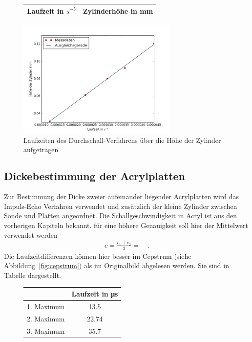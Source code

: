  
 \begin{figure}[h!]
 	\centering
 	\begin{tabular}{c|c}
 		Laufzeit in $s^{-5}$ & Zylinderhöhe in mm\\
 		\hline
 		
 	\end{tabular}
 	\label{tab:durchschall}
 \end{figure}
 
 \begin{figure}[h!]
 	\centering
 	\includegraphics[width=0.7\textwidth]{build/Durchschall.png}
 	\caption{Laufzeiten des Durchschall-Verfahrens über die Höhe der Zylinder aufgetragen}
 	\label{fig:durchschall}
 \end{figure}
 


  
  
  \clearpage
  \subsection{Dickebestimmung der Acrylplatten} 
  Zur Bestimmung der Dicke zweier aufeinander liegender Acrylplatten wird das Impuls-Echo Verfahren verwendet und zusätzlich der kleine Zylinder zwischen Sonde und Platten angeordnet. Die Schallgeschwindigkeit in Acryl ist aus den vorherigen Kapiteln bekannt. für eine höhere Genauigkeit soll hier der Mittelwert verwendet werden
  \begin{align}
  	c = \frac{c_1+ c_2}{2} =  \quad .
  \end{align}
  Die Laufzeitdifferenzen können hier besser im Cepstrum (siehe Abbildung~\ref{fig:cepstrum}) als im Originalbild abgelesen werden. Sie sind in Tabelle \label{tab:laufzeiten_platte} dargestellt.
  
   \begin{figure}[h!]
   	\centering
   	\begin{tabular}{c|c}
   	 & Laufzeit in \si{\micro\second}\\
   		\hline
   	1. Maximum & 13.5 \\
   	2. Maximum & 22.74 \\
   	3. Maximum & 35.7 \\
   	\end{tabular}
   	\label{tab:laufzeiten_platte}
   \end{figure}
  
